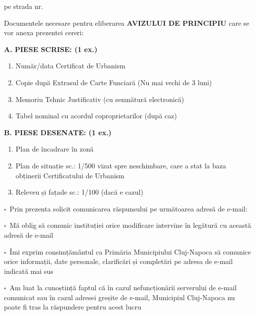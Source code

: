 \documentclass[11pt,a4paper]{article}
\newcommand{\fillline}[1][6cm]{\underline{\hspace{#1}}}
\newcommand{\checkboxempty}{$\square$}
\begin{document}
pe strada \fillline[8cm] nr. \fillline[5cm]

\vspace{0.3cm}

\hspace{0.5cm}Documentele necesare pentru eliberarea \textbf{AVIZULUI DE PRINCIPIU} care se vor anexa prezentei cereri:

\vspace{0.3cm}

\textbf{A. PIESE SCRISE: (1 ex.)}
\begin{enumerate}[leftmargin=*]
\item Număr/data Certificat de Urbanism
\item Copie după Extrasul de Carte Funciară (Nu mai vechi de 3 luni)
\item Memoriu Tehnic Justificativ (cu semnătură electronică)
\item Tabel nominal cu acordul coproprietarilor (după caz)
\end{enumerate}

\textbf{B. PIESE DESENATE: (1 ex.)}
\begin{enumerate}[leftmargin=*]
\item Plan de încadrare în zonă
\item Plan de situație sc.: 1/500 vizat spre neschimbare, care a stat la baza obținerii Certificatului de Urbanism
\item Releveu și fațade sc.: 1/100 (dacă e cazul)
\end{enumerate}

\vspace{0.25cm}

\checkboxempty\ Prin prezenta solicit comunicarea răspunsului pe următoarea adresă de e-mail:\\
\hrulefill

\vspace{0.3cm}

\checkboxempty\ Mă oblig să comunic instituției orice modificare intervine în legătură cu această adresă de e-mail

\checkboxempty\ Îmi exprim consimțământul ca Primăria Municipiului Cluj-Napoca să comunice orice informații, date personale, clarificări și completări pe adresa de e-mail indicată mai sus

\checkboxempty\ Am luat la cunoștință faptul că în cazul nefuncționării serverului de e-mail comunicat sau în cazul adresei greșite de e-mail, Municipiul Cluj-Napoca nu poate fi tras la răspundere pentru acest lucru
\end{document}
